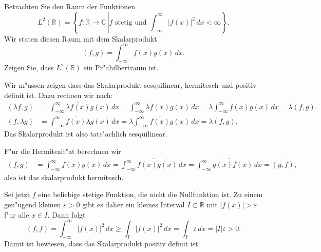 Betrachten Sie den Raum der Funktionen
\[
L^2(\mathbb R)=\left\{
f:\mathbb R\to\mathbb C\,\left|
\text{$f$ stetig und }
\int_{-\infty}^\infty |f(x)|^2\,dx<\infty
\right.
\right\}.
\]
Wir staten diesen Raum mit dem Skalarprodukt
\[
(f,g)=\int_{-\infty}^\infty \overline{f(x)}g(x)\,dx.
\]
Zeigen Sie, dass $L^2(\mathbb R)$ ein Pr"ahilbertraum ist.

\begin{loesung}
Wir m"ussen zeigen dass das Skalarprodukt sesquilinear, hermitesch und positiv
definit ist.
Dazu rechnen wir nach:
\begin{align*}
(\lambda f,g)
&=
\int_{-\infty}^\infty
\overline{\lambda f(x)}g(x)
\,dx
=
\int_{-\infty}^\infty
\bar \lambda \bar f(x)
g(x)
\,dx
=
\bar \lambda
\int_{-\infty}^\infty
\bar f(x) g(x)
\,dx
=\bar\lambda(f,g).
\\
(f,\lambda g)
&=
\int_{-\infty}^\infty
\overline{f(x)}\lambda g(x)
\,dx
=
\lambda
\int_{-\infty}^\infty
\overline{f(x)}g(x)
\,dx
=
\lambda(f,g).
\end{align*}
Das Skalarprodukt ist also tats"achlich sesquilinear.

F"ur die Hermitezit"at berechnen wir
\begin{align*}
(f,g)
&=
\int_{-\infty}^{\infty} \overline{f(x)} g(x)\,dx
=
\overline{
\int_{-\infty}^{\infty} f(x) \overline{g(x)}\,dx
}
=
\overline{
\int_{-\infty}^{\infty}
\overline{g(x)}
f(x)
\,dx
}
=
\overline{(g,f)},
\end{align*}
also ist das skalarprodukt hermitesch.

Sei jetzt $f$ eine beliebige stetige Funktion, die nicht die Nullfunktion
ist. Zu einem gen"ugend kleinen $\varepsilon>0$ gibt es daher ein kleines
Interval $I\subset\mathbb R$ mit $|f(x)|>\varepsilon$ f"ur alle $x\in I$.
Dann folgt
\[
(f,f)
=
\int_{-\infty}^\infty
|f(x)|^2
\,dx
\ge
\int_I|f(x)|^2\,dx
=
\int_I\varepsilon\,dx
=|I|\varepsilon >0.
\]
Damit ist bewiesen, dass das Skalarprodukt positiv definit ist.
\end{loesung}

